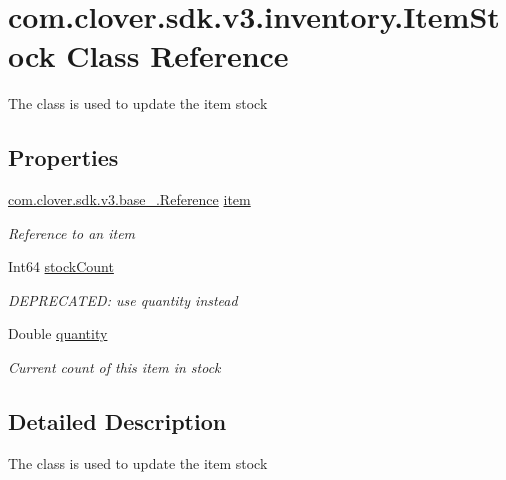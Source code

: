 \hypertarget{classcom_1_1clover_1_1sdk_1_1v3_1_1inventory_1_1_item_stock}{}\section{com.\+clover.\+sdk.\+v3.\+inventory.\+Item\+Stock Class Reference}
\label{classcom_1_1clover_1_1sdk_1_1v3_1_1inventory_1_1_item_stock}


The class is used to update the item stock  


\subsection*{Properties}
\begin{DoxyCompactItemize}
\item 
\hyperlink{classcom_1_1clover_1_1sdk_1_1v3_1_1base___1_1_reference}{com.\+clover.\+sdk.\+v3.\+base\+\_\+.\+Reference} \hyperlink{classcom_1_1clover_1_1sdk_1_1v3_1_1inventory_1_1_item_stock_a722fd121488bc5e89cff73a7f57288be}{item}
\begin{DoxyCompactList}\small\item\em Reference to an item \end{DoxyCompactList}\item 
Int64 \hyperlink{classcom_1_1clover_1_1sdk_1_1v3_1_1inventory_1_1_item_stock_a82cffb225b851027ce3f8177660df6d1}{stock\+Count}
\begin{DoxyCompactList}\small\item\em D\+E\+P\+R\+E\+C\+A\+T\+ED\+: use quantity instead \end{DoxyCompactList}\item 
Double \hyperlink{classcom_1_1clover_1_1sdk_1_1v3_1_1inventory_1_1_item_stock_a34693f5a328c356a74bc5a311277fbe4}{quantity}
\begin{DoxyCompactList}\small\item\em Current count of this item in stock \end{DoxyCompactList}\end{DoxyCompactItemize}


\subsection{Detailed Description}
The class is used to update the item stock 



